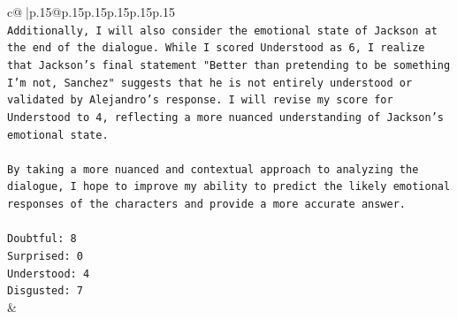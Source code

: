 \documentclass{article}
\begin{document}
{\begin{supertabular}{c@{$\;$}|p{.15\linewidth}@{}p{.15\linewidth}p{.15\linewidth}p{.15\linewidth}p{.15\linewidth}p{.15\linewidth}}
{{{\\ 
\texttt{Additionally, I will also consider the emotional state of Jackson at the end of the dialogue. While I scored Understood as 6, I realize that Jackson's final statement "Better than pretending to be something I'm not, Sanchez" suggests that he is not entirely understood or validated by Alejandro's response. I will revise my score for Understood to 4, reflecting a more nuanced understanding of Jackson's emotional state.} \\
\\ 
\texttt{By taking a more nuanced and contextual approach to analyzing the dialogue, I hope to improve my ability to predict the likely emotional responses of the characters and provide a more accurate answer.} \\
\\ 
\texttt{Doubtful: 8} \\
\texttt{Surprised: 0} \\
\texttt{Understood: 4} \\
\texttt{Disgusted: 7} \\
            }
        }
    }
    & \\ \\

\end{supertabular}
}
\end{document}
